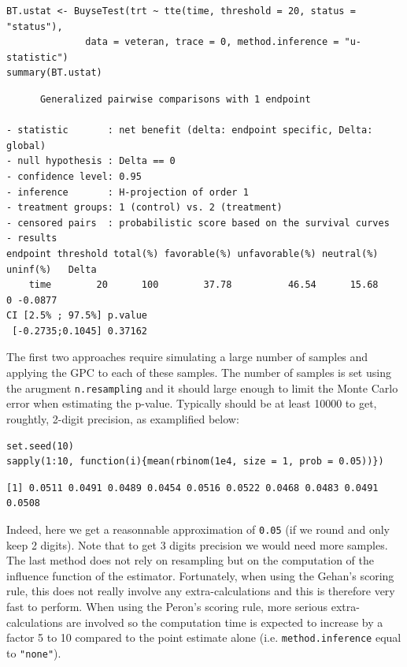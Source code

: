\documentclass[12pt]{article}
\begin{document}
\lstset{language=r,label= ,caption= ,captionpos=b,numbers=none}
\begin{lstlisting}
BT.ustat <- BuyseTest(trt ~ tte(time, threshold = 20, status = "status"),
		      data = veteran, trace = 0, method.inference = "u-statistic") 
summary(BT.ustat)
\end{lstlisting}

\begin{verbatim}
      Generalized pairwise comparisons with 1 endpoint

- statistic       : net benefit (delta: endpoint specific, Delta: global) 
- null hypothesis : Delta == 0 
- confidence level: 0.95 
- inference       : H-projection of order 1
- treatment groups: 1 (control) vs. 2 (treatment) 
- censored pairs  : probabilistic score based on the survival curves
- results
endpoint threshold total(%) favorable(%) unfavorable(%) neutral(%) uninf(%)   Delta
    time        20      100        37.78          46.54      15.68        0 -0.0877
CI [2.5% ; 97.5%] p.value 
 [-0.2735;0.1045] 0.37162
\end{verbatim}

The first two approaches require simulating a large number of samples
and applying the GPC to each of these samples. The number of samples
is set using the arugment \texttt{n.resampling} and it should large enough to
limit the Monte Carlo error when estimating the p-value. Typically
should be at least 10000 to get, roughtly, 2-digit precision, as
examplified below:
\lstset{language=r,label= ,caption= ,captionpos=b,numbers=none}
\begin{lstlisting}
set.seed(10)
sapply(1:10, function(i){mean(rbinom(1e4, size = 1, prob = 0.05))})
\end{lstlisting}

\begin{verbatim}
[1] 0.0511 0.0491 0.0489 0.0454 0.0516 0.0522 0.0468 0.0483 0.0491 0.0508
\end{verbatim}

Indeed, here we get a reasonnable approximation of \texttt{0.05} (if we round
and only keep 2 digits). Note that to get 3 digits precision we would
need more samples. The last method does not rely on resampling but on
the computation of the influence function of the
estimator. Fortunately, when using the Gehan's scoring rule, this does
not really involve any extra-calculations and this is therefore very
fast to perform. When using the Peron's scoring rule, more serious
extra-calculations are involved so the computation time is expected to
increase by a factor 5 to 10 compared to the point estimate alone
(i.e. \texttt{method.inference} equal to \texttt{"none"}).
\end{document}
